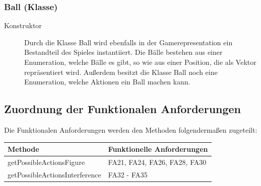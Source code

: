         \subsubsection{Ball (Klasse)}
        \begin{description}
        	\item[Konstruktor]
        	Durch die Klasse Ball wird ebenfalls in der Gamerepresentation ein Bestandteil des Spieles instantiiert. Die Bälle bestehen aus einer Enumeration, welche Bälle es gibt, so wie aus einer Position, die als Vektor repräsentiert wird. Außerdem besitzt die Klasse Ball noch eine Enumeration, welche Aktionen ein Ball machen kann.
        \end{description}

\subsection{Zuordnung der Funktionalen Anforderungen}

Die Funktionalen Anforderungen werden den Methoden folgendermaßen zugeteilt:


\begin{table}[h]
	\centering
	\begin{tabular}{|l|l|}
    	\hline
    	\textbf{Methode} & \textbf{Funktionelle Anforderungen} \\ \hline
    	getPossibleActionsFigure		&	FA21, FA24, FA26, FA28, FA30\\ \hline
    	getPossibleActionsInterference	&	FA32 - FA35\\ \hline

	\end{tabular}
\end{table}